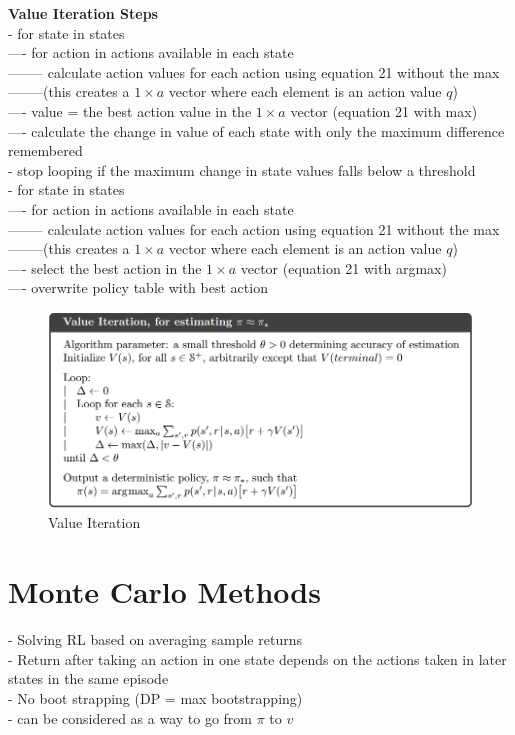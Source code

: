 \documentclass{article}
\begin{document}
\noindent
\textbf{Value Iteration Steps}\\
- for state in states \\
---- for action in actions available in each state \\
-------- calculate action values for each action using equation 21 without the
max\\
--------(this creates a $1 \times a$ vector where each element is an
action value $q$)\\
---- value = the best action value in the $ 1 \times a$ vector (equation 21 with
max)\\
---- calculate the change in value of each state with only the maximum
difference remembered\\
- stop looping if the maximum change in state values falls below a threshold\\
- for state in states\\
---- for action in actions available in each state \\
-------- calculate action values for each action using equation 21 without the
max\\
--------(this creates a $1 \times a$ vector where each element is an
action value $q$)\\
---- select the best action in the $ 1 \times a$ vector (equation 21 with
argmax)\\
---- overwrite policy table with best action

\begin{figure}[h]
\includegraphics[scale=0.3]{value_iteration}
\centering
\caption{Value Iteration}
\end{figure}

\newpage
\noindent
\section{Monte Carlo Methods}
- Solving RL based on averaging sample returns\\
- Return after taking an action in one state depends on the actions taken in
later states in the same episode\\
- No boot strapping (DP = max bootstrapping)\\
- can be considered as a way to go from $\pi$ to $v$\\
\end{document}
